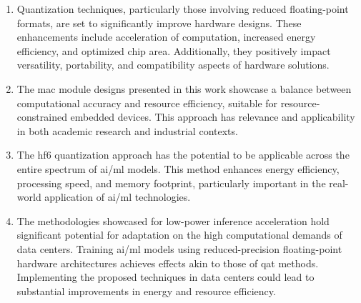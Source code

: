 \begin{enumerate}
	\item Quantization techniques, particularly those involving reduced floating-point formats, are set to significantly improve hardware designs. These enhancements include acceleration of computation, increased energy efficiency, and optimized chip area. Additionally, they positively impact versatility, portability, and compatibility aspects of hardware solutions.
	
	\item The \gls{mac} module designs presented in this work showcase a balance between computational accuracy and resource efficiency, suitable for resource-constrained embedded devices. This approach has relevance and applicability in both academic research and industrial contexts.
	
	\item The \gls{hf6} quantization approach has the potential to be applicable across the entire spectrum of \gls{ai}/\gls{ml} models. This method enhances energy efficiency, processing speed, and memory footprint, particularly important in the real-world application of \gls{ai}/\gls{ml} technologies.
	
	\item The methodologies showcased for low-power inference acceleration hold significant potential for adaptation on the high computational demands of data centers. Training \gls{ai}/\gls{ml} models using reduced-precision floating-point hardware architectures achieves effects akin to those of \gls{qat} methods. Implementing the proposed techniques in data centers could lead to substantial improvements in energy and resource efficiency.
\end{enumerate}

